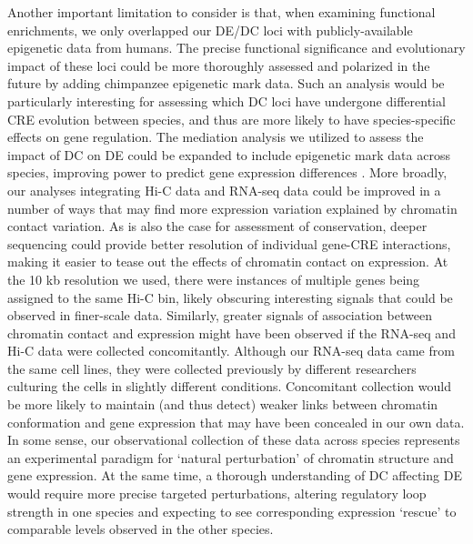 Another important limitation to consider is that, when examining functional enrichments, we only overlapped our DE/DC loci with publicly-available epigenetic data from humans. The precise functional significance and evolutionary impact of these loci could be more thoroughly assessed and polarized in the future by adding chimpanzee epigenetic mark data. Such an analysis would be particularly interesting for assessing which DC loci have undergone differential CRE evolution between species, and thus are more likely to have species-specific effects on gene regulation. The mediation analysis we utilized to assess the impact of DC on DE could be expanded to include epigenetic mark data across species, improving power to predict gene expression differences \cite{Karlic.2010}. More broadly, our analyses integrating Hi-C data and RNA-seq data could be improved in a number of ways that may find more expression variation explained by chromatin contact variation. As is also the case for assessment of conservation, deeper sequencing could provide better resolution of individual gene-CRE interactions, making it easier to tease out the effects of chromatin contact on expression. At the 10 kb resolution we used, there were instances of multiple genes being assigned to the same Hi-C bin, likely obscuring interesting signals that could be observed in finer-scale data. Similarly, greater signals of association between chromatin contact and expression might have been observed if the RNA-seq and Hi-C data were collected concomitantly. Although our RNA-seq data came from the same cell lines, they were collected previously by different researchers culturing the cells in slightly different conditions. Concomitant collection would be more likely to maintain (and thus detect) weaker links between chromatin conformation and gene expression that may have been concealed in our own data. In some sense, our observational collection of these data across species represents an experimental paradigm for `natural perturbation' of chromatin structure and gene expression. At the same time, a thorough understanding of DC affecting DE would require more precise targeted perturbations, altering regulatory loop strength in one species and expecting to see corresponding expression `rescue' to comparable levels observed in the other species.

